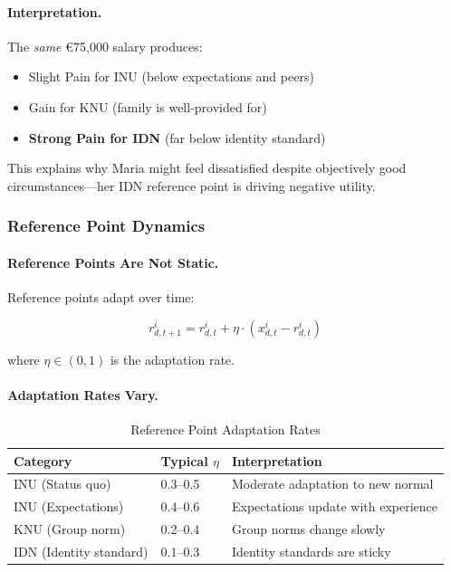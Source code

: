 \paragraph{Interpretation.}
The \emph{same} \euro{75,000} salary produces:
\begin{itemize}
\item Slight Pain for INU (below expectations and peers)
\item Gain for KNU (family is well-provided for)
\item \textbf{Strong Pain for IDN} (far below identity standard)
\end{itemize}

This explains why Maria might feel dissatisfied despite objectively good 
circumstances---her IDN reference point is driving negative utility.

\subsubsection{Reference Point Dynamics}

\paragraph{Reference Points Are Not Static.}
Reference points adapt over time:

\begin{equation}
r^i_{d,t+1} = r^i_{d,t} + \eta \cdot (x^i_{d,t} - r^i_{d,t})
\end{equation}

where $\eta \in (0, 1)$ is the adaptation rate.

\paragraph{Adaptation Rates Vary.}

\begin{table}[htbp]
\centering
\caption{Reference Point Adaptation Rates}
\label{tab:adaptation-rates}
\renewcommand{\arraystretch}{1.3}
\begin{tabular}{@{}lll@{}}
\toprule
\textbf{Category} & \textbf{Typical $\eta$} & \textbf{Interpretation} \\
\midrule
INU (Status quo) & 0.3--0.5 & Moderate adaptation to new normal \\
INU (Expectations) & 0.4--0.6 & Expectations update with experience \\
KNU (Group norm) & 0.2--0.4 & Group norms change slowly \\
IDN (Identity standard) & 0.1--0.3 & Identity standards are sticky \\
\bottomrule
\end{tabular}
\end{table}

